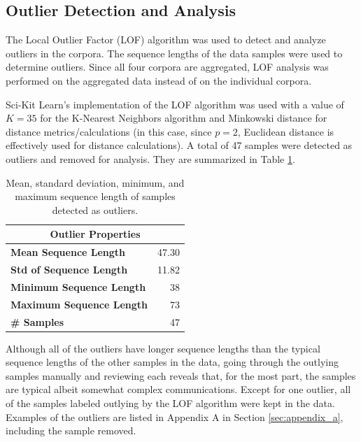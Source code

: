 \documentclass[12pt]{article}
\begin{document}
\subsection{Outlier Detection and Analysis}\label{sec:outliers}
The Local Outlier Factor (LOF) algorithm \cite{breunig_lof_2000} was used to detect and analyze outliers in the corpora. The sequence lengths of the
data samples were used to determine outliers. Since all four corpora are aggregated, LOF analysis was performed on the aggregated data instead of on
the individual corpora.

Sci-Kit Learn's \cite{pedregosa_scikit-learn_2011} implementation of the LOF algorithm was used with a value of \(K = 35\) for the K-Nearest Neighbors algorithm and Minkowski distance for distance metrics/calculations (in this case, since \(p=2\), Euclidean distance is effectively used for distance calculations). A total of 47 samples were detected as outliers and removed for analysis. They are summarized in Table \ref{tab:outlier_stats}.

\begin{table}[!t]
    \centering
    \begin{tabular}{l | r}
        \toprule
        \multicolumn{2}{c}{Outlier Properties}   \\
        \midrule
        \textbf{Mean Sequence Length}    & 47.30 \\
        \textbf{Std of Sequence Length}  & 11.82 \\
        \textbf{Minimum Sequence Length} & 38    \\
        \textbf{Maximum Sequence Length} & 73    \\
        \textbf{\# Samples}              & 47    \\
        \bottomrule
    \end{tabular}
    \caption{Mean, standard deviation, minimum, and maximum sequence length of samples detected as outliers.}
    \label{tab:outlier_stats}
\end{table}

Although all of the outliers have longer sequence lengths than the typical sequence lengths of the other samples in the data, going through the outlying samples manually and reviewing each reveals that, for the most part, the samples are typical albeit somewhat complex communications. Except for one outlier, all of the samples labeled outlying by the LOF algorithm were kept in the data. Examples of the outliers are listed in Appendix A in Section \ref{sec:appendix_a}, including the sample removed.
\end{document}
